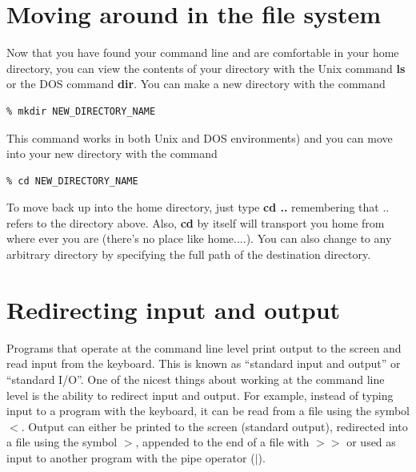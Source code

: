 \documentclass[11pt]{book}
\begin{document}
{
\section{Moving around in the file system}

Now that you have found your command line and are comfortable in your home directory, you can view the contents of your directory with the Unix command {\bf ls} or the DOS command {\bf dir}.
You can make a new directory with the command
\begin{verbatim}
% mkdir NEW_DIRECTORY_NAME
\end{verbatim}
This command works in both Unix and DOS environments) and you can move into your new directory with the command
\begin{verbatim}
% cd NEW_DIRECTORY_NAME
\end{verbatim}
   To move back up into the home directory, just type {\bf cd ..} remembering that .. refers to the directory above.  Also, {\bf cd} by itself will transport you home from where ever you are (there's no place like home....).     You can also change to any arbitrary directory by specifying the full path of the destination directory.


%
%


\section {Redirecting input and output}

Programs that operate at the command line level print output to the screen and read input
from the keyboard. This is
known as ``standard input and output'' or ``standard I/O''.
One of the nicest things about working at the command line level is the ability to redirect input and output.
For example, instead of typing input to a program with the keyboard, it can
be read from a file using the symbol {\bf $<$}.   Output can either be printed to the screen (standard output), redirected into a file using the symbol {\bf $>$}, appended to the end of a file with {\bf $>>$} or
used as input to another program with the pipe operator ({\bf$ |$}).

}
\end{document}
